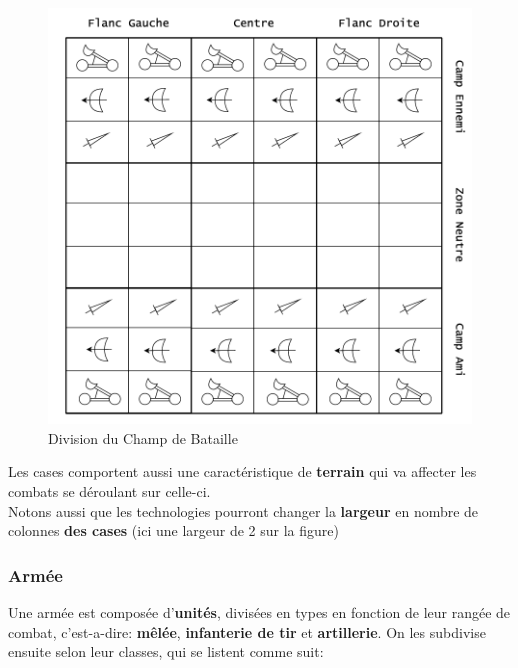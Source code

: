 \documentclass{article}
\begin{document}
                \begin{figure}[h]
                    \centering
                        \includegraphics[scale=0.5]{schema_champ_de_bataille.png}
                        \caption{Division du Champ de Bataille}
                        \label{fig:x photosysteme}
                \end{figure}

                Les cases comportent aussi une caractéristique de \textbf{terrain } qui va affecter les combats se déroulant sur celle-ci.\\
                Notons aussi que les technologies pourront changer la \textbf{largeur} en nombre de colonnes \textbf{des cases} (ici une largeur de 2 sur la figure)
                
            \subsubsection{Armée}
                Une armée est composée d'\textbf{unités}, divisées en types en fonction de leur rangée de combat, c'est-a-dire: \textbf{mêlée}, \textbf{infanterie de tir} et \textbf{artillerie}. On les subdivise ensuite selon leur classes, qui se listent comme suit:
\end{document}
